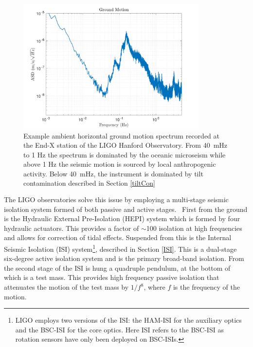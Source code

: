 \documentclass [12pt, proquest]{uwthesis}[2019]
\begin{document}
\begin{figure}[!h]
\begin{center}
\includegraphics[width=0.85\textwidth]{GroundSpectrum.pdf}
\caption[Example ambient ground motion spectrum]{Example ambient horizontal ground motion spectrum recorded at the End-X station of the LIGO Hanford Observatory. From 40~mHz to 1 Hz the spectrum is dominated by the oceanic microseism while above 1 Hz the seismic motion is sourced by local anthropogenic activity. Below 40~mHz, the instrument is dominated by tilt contamination described in Section \ref{tiltCon}}
\label{groundSpec}
\end{center}
\end{figure}

The LIGO observatories solve this issue by employing a multi-stage seismic isolation system formed of both passive and active stages.~\cite{ligoSeis} First from the ground is the Hydraulic External Pre-Isolation (HEPI) system which is formed by four hydraulic actuators. This provides a factor of $\sim$100 isolation at high frequencies and allows for correction of tidal effects. Suspended from this is the Internal Seismic Isolation (ISI) system\footnote{LIGO employs two versions of the ISI: the HAM-ISI for the auxiliary optics and the BSC-ISI for the core optics. Here ISI refers to the BSC-ISI as rotation sensors have only been deployed on BSC-ISIs.}, described in Section \ref{ISI}. This is a dual-stage six-degree active isolation system and is the primary broad-band isolation. From the second stage of the ISI is hung a quadruple pendulum, at the bottom of which is a test mass. This provides high frequency passive isolation that attenuates the motion of the test mass by $1/f^8$, where $f$ is the frequency of the motion.
\end{document}
